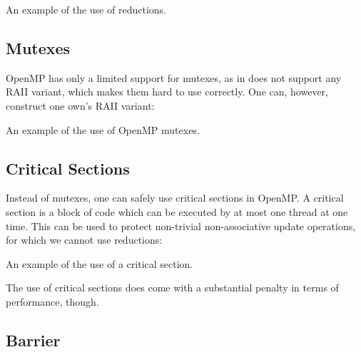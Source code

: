 \raggedbottom
\begin{codebox}[]{\href{https://godbolt.org/z/orfM3x13M}{\ExternalLink}}
\footnotesize An example of the use of reductions.
\tcblower
{}
\end{codebox}

\subsection{Mutexes}

OpenMP has only a limited support for mutexes, as in does not support any RAII variant, 
which makes them hard to use correctly. One can, however, construct one own's RAII variant:


\raggedbottom
\begin{codebox}[]{\href{https://godbolt.org/z/vnsW7v35z}{\ExternalLink}}
\footnotesize An example of the use of OpenMP mutexes.
\tcblower
{}
\end{codebox}

\subsection{Critical Sections}

Instead of mutexes, one can safely use critical sections in OpenMP. 
A critical section is a block of code which can be executed by at most 
one thread at one time.
This can be used to protect non-trivial non-associative update operations, 
for which we cannot use reductions: 

\raggedbottom
\begin{codebox}[]{\href{https://godbolt.org/z/YYeqYEdv3}{\ExternalLink}}
\footnotesize An example of the use of a critical section.
\tcblower
{}
\end{codebox}

The use of critical sections does come with a substantial penalty in terms of performance, though. 

\subsection{Barrier}

